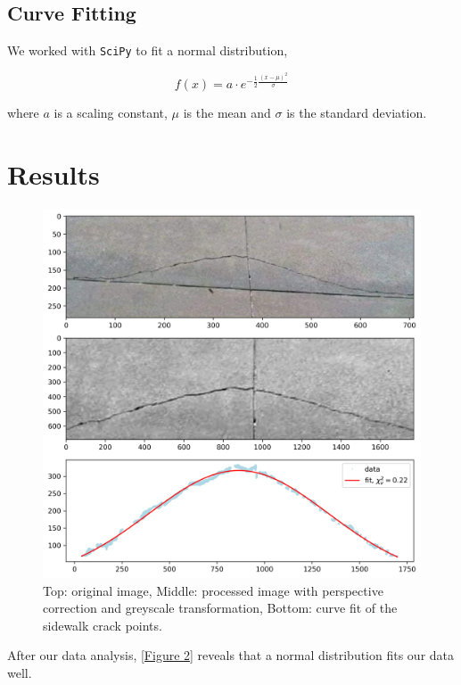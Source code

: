 \documentclass{article}
\begin{document}
\subsection{Curve Fitting}

We worked with \texttt{SciPy}\cite{2020SciPy-NMeth} to fit a normal distribution,

\begin{equation}
    f(x) = a \cdot e^{-\frac{1}{2}\frac{(x-\mu)^2}{\sigma}}
\end{equation}

where $a$ is a scaling constant, $\mu$ is the mean and $\sigma$ is the standard deviation.

\section{Results}

\begin{figure}[h]
    \centering
    \includegraphics[width=13cm]{fit.png}
    \caption{Top: original image, Middle: processed image with perspective correction and greyscale transformation, Bottom: curve fit of the sidewalk crack points.}
    \label{Figure 2}
\end{figure}

After our data analysis, \autoref{Figure 2} reveals that a normal distribution fits our data well.
\end{document}
